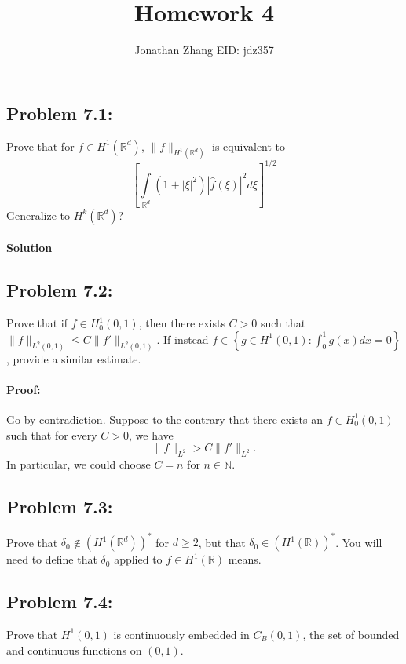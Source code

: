 \documentclass[letterpaper,twoside,11pt]{article}
\theoremstyle{mystyle}
\newcommand{\R}{{\mathbb R}}
\newcommand{\N}{{\mathbb N}}
\begin{document}
\title{\vspace{-2\baselineskip} 
Homework 4
}
\author{Jonathan Zhang \qquad EID: { jdz357} }
\date{}
\maketitle


\subsection*{Problem 7.1:}
Prove that for $f \in H^1\left( \R^d \right)$, $\|f\|_{H^1\left( \R^d \right)}$ is equivalent to 
\[\left[\int\limits_{\R^d} \left( 1+|\xi|^2 \right)|\hat f\left( \xi \right)|^2d\xi \right]^{1/2}\]
Generalize to $H^k\left( \R^d \right)$?

\paragraph*{Solution}




\subsection*{Problem 7.2:}
Prove that if $f \in H_0^1\left( 0,1 \right)$, then there exists $C>0$ such that $\|f\|_{L^2(0,1)} \leq C \|f'\|_{L^2(0,1)}$. 
If instead $f \in \left\{ g \in H^1(0,1) : \int_0^1 g(x) dx = 0 \right\}$, provide a similar estimate. 

\paragraph*{Proof: }
Go by contradiction. Suppose to the contrary that there exists an $f \in H_0^1(0,1)$ such that for every $C>0$, we have 
\[\|f\|_{L^2} > C \|f'\|_{L^2}.\]
In particular, we could choose $C=n$ for $n \in \N$. 

\subsection*{Problem 7.3:}
Prove that $\delta_0 \notin \left( H^1\left( \R^d \right) \right)^*$ for $d \geq 2$, but that $\delta_0 \in \left( H^1\left( \R \right) \right)^*$. You will need to define that $\delta_0$ applied to $f \in H^1\left( \R \right)$ means. 



\subsection*{Problem 7.4:}
Prove that $H^1(0,1)$ is continuously embedded in $C_B(0,1)$, the set of bounded and continuous functions on $(0,1)$. 
\end{document}

